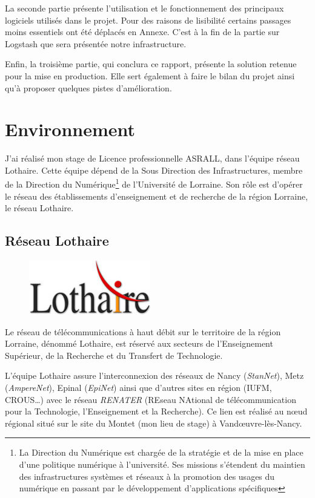 \documentclass[a4paper,12pt,one side,titlepage]{report}
\begin{document}
La seconde partie présente l'utilisation et le fonctionnement des principaux logiciels
utilisés dans le projet. Pour des raisons de lisibilité certains passages moins 
essentiels ont été déplacés en Annexe. C'est à la fin de la partie sur Logstash que
sera présentée notre infrastructure.

Enfin, la troisième partie, qui conclura ce rapport,  présente la solution retenue 
pour la mise en production. Elle sert également à faire le bilan du projet ainsi 
qu'à proposer quelques pistes d'amélioration.


\chapter{Environnement}
J'ai réalisé mon stage de Licence professionnelle ASRALL, dans l'équipe réseau Lothaire.
Cette équipe dépend de la Sous Direction des Infrastructures, membre de la Direction 
du Numérique\footnote{La Direction du Numérique est chargée de la stratégie et de la 
mise en place d'une politique numérique à l'université. Ses missions s'étendent du maintien 
des infrastructures systèmes et réseaux à la promotion des usages du numérique en passant
par le développement d'applications spécifiques} de l'Université de Lorraine. Son rôle est 
d'opérer le réseau des établissements d'enseignement et de recherche de la région Lorraine, le 
réseau Lothaire.
\section{Réseau Lothaire}
\begin{figure}[H]
\center
\includegraphics{lothaire.jpg}
\end{figure}
Le réseau de télécommunications à haut débit sur le territoire de la région Lorraine, 
dénommé Lothaire, est réservé aux secteurs de l’Enseignement Supérieur, de la Recherche 
et du Transfert de Technologie. 

L'équipe Lothaire assure l’interconnexion des réseaux de Nancy (\emph{StanNet}), 
Metz (\emph{AmpereNet}), Epinal (\emph{EpiNet}) ainsi que d'autres sites en région 
(IUFM, CROUS\ldots) avec le réseau \emph{RENATER} (REseau NAtional de télécommunication 
pour la Technologie, l'Enseignement et la Recherche). Ce lien est réalisé au nœud 
régional situé sur le site du Montet (mon lieu de stage) à Vandœuvre-lès-Nancy.
\end{document}
